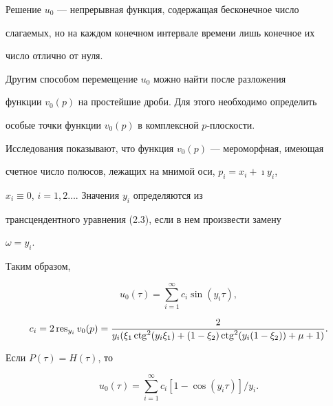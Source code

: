 Решение $u_{0}$ --- непрерывная функция, содержащая бесконечное число


слагаемых, но на каждом конечном интервале времени лишь конечное их


число отлично от нуля.





Другим способом перемещение $u_{0}$ можно найти после разложения


функции $v_{0}(p)$ на простейшие дроби. Для этого необходимо определить


особые точки функции $v_{0}(p)$ в комплексной $p$-плоскости.


Исследования показывают, что функция $v_{0}(p)$ --- мероморфная, имеющая


счетное число полюсов, лежащих на мнимой оси, $p_{i}=x_{i}+\imath y_{i}$,


$x_{i}\equiv 0$, $i=1,2\dotsc$. Значения $y_{i}$ определяются из


трансцендентного уравнения (2.3), если в нем произвести замену


$\omega= y_{i}$.





Таким образом,


\begin{equation}


u_{0}(\tau)=\sum_{i=1}^{\infty}c_{i} \sin(y_{i}\tau),


\tag{3.5}


\end{equation}


$$


c_{i}=2 \res_{y_{i}}v_{0}(p)=\frac{2}


{y_{i}(\xi_{1}\ctg^{2}(y_i\xi_{1})+(1-\xi_{2})\ctg^{2}(y_{i}(1-


\xi_{2}))+\mu+1)}.


$$





Если $P(\tau)=H(\tau)$, то


\begin{equation}


u_{0}(\tau)=\sum_{i=1}^{\infty}c_{i}[1-\cos(y_{i}\tau)]/y_{i}.


\tag{3.6}


\end{equation}





